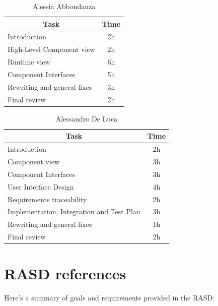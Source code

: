\documentclass[12pt]{report}
\begin{document}
\begin{table}[h]
\centering
\begin{tabular}{|l|c|}
\hline
\multicolumn{1}{|c|}{Task}      & Time \\ \hline
Introduction                    & 2h    \\ \hline
High-Level Component view       & 2h    \\ \hline
Runtime view                    & 6h    \\ \hline
Component Interfaces            & 5h    \\ \hline
Rewriting and general fixes & 3h \\ \hline
Final review & 2h \\ \hline
\end{tabular}
\caption{Alessia Abbondanza}
\label{tab:my-table15}
\end{table}

\begin{table}[h]
\centering
\begin{tabular}{|l|c|}
\hline
\multicolumn{1}{|c|}{Task}      & Time \\ \hline
Introduction                    & 2h    \\ \hline
 Component view       & 3h    \\ 
 \hline
Component Interfaces            & 3h    \\ \hline
User Interface Design            & 4h    \\ \hline
Requirements traceability       & 2h    \\ \hline
Implementation, Integration and Test Plan     & 3h    \\ \hline
Rewriting and general fixes & 1h \\ \hline
Final review & 2h \\ \hline
\end{tabular}
\caption{Alessandro De Luca}
\label{tab:my-table14}
\end{table}

\chapter{RASD references}
Here's a summary of goals and requirements provided in the RASD:\\
\end{document}
